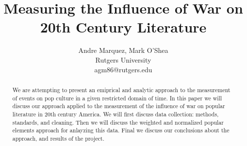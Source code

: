 \documentclass[twoside]{article}
\title{\vspace{-15mm}%
	\fontsize{24pt}{10pt}\selectfont
	\textbf{Measuring the Influence of War on 20th Century Literature}
	}
\author{
    Andre Marquez, Mark O'Shea\\
    Rutgers University\\
    agm86@rutgers.edu
}
\date{}
\begin{document}
\maketitle
\thispagestyle{fancy}

\begin{abstract}
\noindent 
We are attempting to present an emiprical and analytic approach to the measurement of events on pop culture in a given restricted domain of time. In this paper we will discuss our approach applied to the measurement of the influence of war on popular literature in 20th century America. We will first discuss data collection: methods, standards, and cleaning. Then we will discuss the weighted and normalized popular elements approach for anlayzing this data. Final we discuss our conclusions about the approach, and results of the project.
\end{abstract}
\smallskip
	
\end{document}
